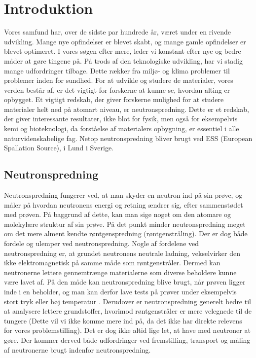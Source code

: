 \documentclass[12pt,oneside,a4paper]{article}
\begin{document}
{{{{{%
\newpage

\tableofcontents

\newpage


\section{Introduktion}

Vores samfund har, over de sidste par hundrede år, været under en rivende udvikling. Mange nye opfindelser er blevet skabt, og mange gamle opfindelser er blevet optimeret. I vores søgen efter mere, leder vi konstant efter nye og bedre måder at gøre tingene på. På trods af den teknologiske udvikling, har vi stadig mange udfordringer tilbage. Dette rækker fra miljø- og klima problemer til problemer inden for sundhed. For at udvikle og studere de materialer, vores verden består af, er det vigtigt for forskerne at kunne se, hvordan alting er opbygget. Et vigtigt redskab, der giver forskerne mulighed for at studere materialer helt ned på atomart niveau, er neutronspredning. Dette er et redskab, der giver interessante resultater, ikke blot for fysik, men også for eksempelvis kemi og bioteknologi, da forståelse af materialers opbygning, er essentiel i alle naturvidenskabelige fag. Netop neutronspredning bliver brugt ved ESS (European Spallation Source), i Lund i Sverige. \cite{ess_folder}

\subsection{Neutronspredning}
Neutronspredning fungerer ved, at man skyder en neutron ind på sin prøve, og måler på hvordan neutronens energi og retning ændrer sig, efter sammenstødet med prøven. På baggrund af dette, kan man sige noget om den atomare og molekylære struktur af sin prøve. På det punkt minder neutronspredning meget om det mere alment kendte røntgenspredning (røntgenstråling). Der er dog både fordele og ulemper ved neutronspredning. Nogle af fordelene ved neutronspredning er, at grundet neutronens neutrale ladning, vekselvirker den ikke elektromagnetisk på samme måde som røntgenstråler. Dermed kan neutronerne lettere gennemtrænge materialerne som diverse beholdere kunne være lavet af. På den måde kan neutronspredning blive brugt, når prøven ligger inde i en beholder, og man kan derfor lave tests på prøver under eksempelvis stort tryk eller høj temperatur . Derudover er neutronspredning generelt bedre til at analysere lettere grundstoffer, hvorimod røntgenstråler er mere velegnede til de tungere (Dette vil vi ikke komme mere ind på, da det ikke har direkte relevens for vores problemstilling). Det er dog ikke altid lige let, at have med neutroner at gøre. Der kommer derved både udfordringer ved fremstilling, transport og måling af neutronerne brugt indenfor neutronspredning.

}}}}}
\end{document}

